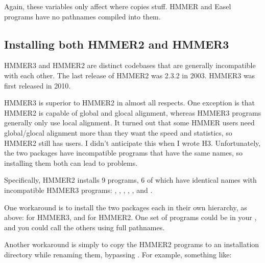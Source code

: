 Again, these variables only affect where  copies
stuff. HMMER and Easel programs have no pathnames compiled into them.

\subsection{Installing both HMMER2 and HMMER3}

HMMER3 and HMMER2 are distinct codebases that are generally
incompatible with each other. The last release of HMMER2 was 2.3.2 in
2003. HMMER3 was first released in 2010.

HMMER3 is superior to HMMER2 in almost all respects. One exception is
that HMMER2 is capable of global and glocal alignment, whereas HMMER3
programs generally only use local alignment.  It turned out that some HMMER users need
global/glocal alignment more than they want the speed and statistics,
so HMMER2 still has users. I didn't anticipate this when I wrote
H3. Unfortunately, the two packages have incompatible programs that
have the same names, so installing them both can lead to problems.

Specifically, HMMER2 installs 9 programs, 6 of which have identical
names with incompatible HMMER3 programs: ,
, , , ,
and .

One workaround is to install the two packages each in their own
hierarchy, as above: 
for HMMER3, and  for
HMMER2. One set of programs could be in your , and you
could call the others using full pathnames.

Another workaround is simply to copy the HMMER2 programs to an
installation directory while renaming them, bypassing .
For example, something like:

  \vspace{1ex}
   \\
   \\
  \vspace{1ex}

